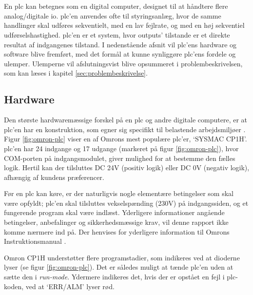 \section{}
\label{sec:plc-pa}
En \gls{plc} kan betegnes som en digital computer, designet til at håndtere flere analog/digitale \gls{io}. \gls{plc}'en anvendes ofte til styringsanlæg, hvor de samme handlinger skal udføres sekventielt, med en lav fejlrate, og med en høj sekventiel udførselshastighed. \gls{plc}'en er et system, hvor outputs' tilstande er et direkte resultat af indgangenes tilstand. I nedenstående afsnit vil \gls{plc}'ens hardware og software blive fremført, med det formål at kunne synliggøre \gls{plc}'ens fordele og ulemper. Ulemperne vil afslutningsvist blive opsummeret i problembeskrivelsen, som kan læses i kapitel \ref{sec:problembeskrivelse}. 

\subsection{Hardware}
\label{subsec:pa-hardware}
Den største hardwaremæssige forskel på en \gls{plc} og andre digitale computere, er at \gls{plc}'en har en konstruktion, som egner sig specifikt til belastende arbejdsmiljøer \cite{PLC_hardware_desc}.
Figur \ref{fig:omron-plc} viser en af Omrons mest populære \gls{plc}'er, \enquote*{SYSMAC CP1H}. \gls{plc}'en har 24 indgange og 17 udgange (markeret på figur \ref{fig:omron-plc}), hvor COM-porten på indgangsmodulet, giver mulighed for at bestemme den fælles logik. Hertil kan der tilsluttes DC 24V (positiv logik) eller DC 0V (negativ logik), afhængig af kundens præferencer. 

Før en \gls{plc} kan køre, er der naturligvis nogle elementære betingelser som skal være opfyldt; \gls{plc}'en skal tilsluttes vekselspænding (230V) på indgangssiden, og et fungerende program skal være indlæst. Yderligere informationer angående betingelser, anbefalinger og sikkerhedsmæssige krav, vil denne rapport ikke komme nærmere ind på. Der henvises for yderligere information til Omrons Instruktionsmanual \cite{basic_knowledge_plc}.

Omron CP1H understøtter flere programstadier, som indikeres ved at dioderne lyser (se figur \ref{fig:omron-plc}). Det er således muligt at tænde \gls{plc}'en uden at sætte den i \textit{run-mode}. Ydermere indikeres det, hvis der er opstået en fejl i \gls{plc}-koden, ved at \enquote*{ERR/ALM} lyser rød. 


